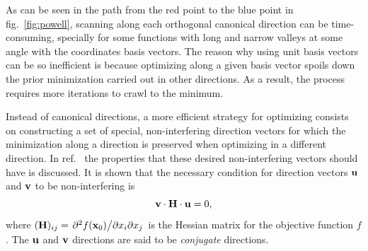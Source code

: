 As can be seen in the path from the red point to the blue point in fig.~\ref{fig:powell}, scanning along each orthogonal canonical direction can be time-consuming, specially for some functions with long and narrow valleys at some angle with the coordinates basis vectors.
The reason why using unit basis vectors can be so inefficient is because optimizing along a given basis vector spoils down the prior minimization carried out in other directions. As a result, the process requires more iterations to crawl to the minimum.

Instead of canonical directions, a more efficient strategy for optimizing consists on constructing a set of special, non-interfering direction vectors for which the minimization along a direction is preserved when optimizing in a different direction.
In ref.~\cite{press_numerical_2007} the properties that these desired non-interfering vectors should have is discussed. It is shown that the necessary condition for direction vectors $\vb{u}$ and $\vb{v}$ to be non-interfering is
\begin{equation}
    \vb{v}\cdot\vb{H}\cdot\vb{u}=0,
\end{equation}
where $(\vb{H})_{ij} = \pdv*{f(\vb{x}_0)}{x_i}{x_j}$ is the Hessian matrix for the objective function $f$. The $\vb{u}$ and $\vb{v}$ directions are said to be \textit{conjugate} directions.


